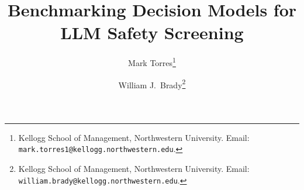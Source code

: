 \documentclass[11pt]{article}
\title{Benchmarking Decision Models for LLM Safety Screening}
\author{%
Mark Torres\thanks{Kellogg School of Management, Northwestern University.
Email: \texttt{mark.torres1@kellogg.northwestern.edu}.}%
\and
William J.\ Brady\thanks{Kellogg School of Management, Northwestern University.
Email: \texttt{william.brady@kellogg.northwestern.edu}.}%
}
\date{}
\begin{document}
\maketitle

\begin{abstract}

\end{abstract}












\clearpage
\appendix


\FloatBarrier


\end{document}

